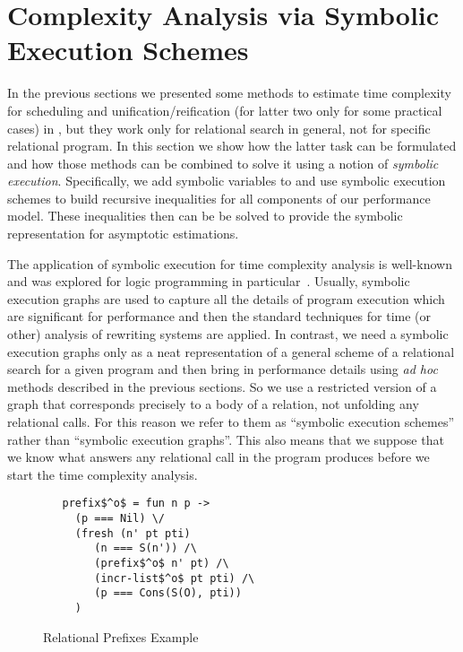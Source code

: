 \section{Complexity Analysis via Symbolic Execution Schemes}
\label{sec:symbolic}

In the previous sections we presented some methods to estimate time complexity for scheduling and unification/reification (for latter two only for some practical cases) in \mK, but they work
only for relational search in general, not for specific relational program. In this section we show how the latter task can be formulated and how those methods can be combined to solve
it using a notion of \emph{symbolic execution}.
Specifically, we add symbolic variables to \mK and use symbolic execution schemes to build recursive inequalities for all components of our performance model.
These inequalities then can be be solved to provide the symbolic representation for asymptotic estimations.

The application of symbolic execution for time complexity analysis is well-known and was explored for logic programming in particular~\cite{SymbolicExecutionForAnalysis}.
Usually, symbolic execution graphs are used to capture all the details of program execution which are significant for performance and then the standard techniques for time (or other)
analysis of rewriting systems are applied. In contrast, we need a symbolic execution graphs only as a neat representation of a general scheme of a relational search for a
given program and then bring in performance details using \emph{ad hoc} methods described in the previous sections. So we use a restricted version of a graph that corresponds
precisely to a body of a relation, not unfolding any relational calls. For this reason we refer to them as ``symbolic execution schemes'' rather than ``symbolic execution graphs''.
This also means that we suppose that we know what answers any relational call in the program produces before we start the time complexity analysis.

\begin{figure}[t]
\begin{lstlisting}
   prefix$^o$ = fun n p ->
     (p === Nil) \/
     (fresh (n' pt pti)
        (n === S(n')) /\
        (prefix$^o$ n' pt) /\
        (incr-list$^o$ pt pti) /\
        (p === Cons(S(O), pti))
     )
\end{lstlisting}

\caption{Relational Prefixes Example}
\label{fig:prefixo_definition}
\end{figure}


